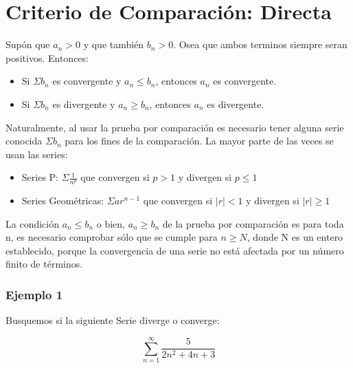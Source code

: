 \documentclass[12pt]{report}                                %
\begin{document}
    \clearpage
    \section{Criterio de Comparación: Directa}

        Supón que $a _n > 0$ y que también $b_n > 0$. Osea que ambos terminos siempre seran positivos.
        Entonces:

        \begin{itemize}
            \item Si $\Sigma b_n$ es convergente y $a_n \leq b_n$, entonces $a_n$ es convergente. 
            \item Si $\Sigma b_n$ es divergente y $a_n \geq b_n$, entonces $a_n$ es divergente. 
        \end{itemize}

        Naturalmente, al usar la prueba por comparación es necesario tener alguna serie conocida $\Sigma b_n$
        para los fines de la comparación. La mayor parte de las veces se usan las series:

        \begin{itemize}
            \item Series P: $\Sigma \frac{1}{n^p}$ que convergen si $p>1$ y divergen si $p\leq 1$
            \item Series Geométricas: $\Sigma ar^{n-1}$ que convergen si $|r|<1$ y divergen si $|r|\geq 1$
        \end{itemize}

        La condición $a_n \leq b_n$ o bien, $a_n \geq b_n$ de la prueba por comparación es para toda n, es
        necesario comprobar sólo que se cumple para $n \geq N$, donde N es un entero establecido, porque
        la convergencia de una serie no está afectada por un número finito de términos.

            \subsubsection{Ejemplo 1}
            Busquemos si la siguiente Serie diverge o converge:

            \begin{equation*}
                \sum_{n=1}^{\infty} \frac{5}{2n^2 +4n +3}
            \end{equation*}
\end{document}
